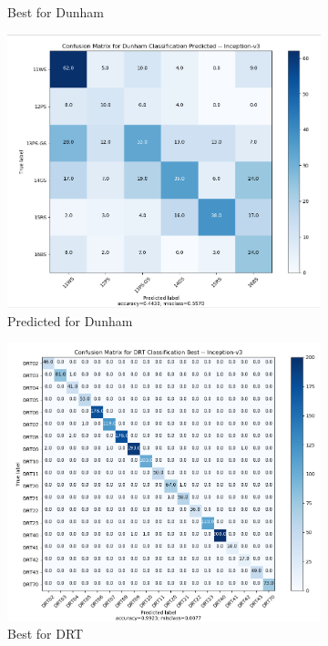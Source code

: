 \begin{figure}
\begin{subfigure}{.5\textwidth}
  \caption{Best for Dunham}
  \label{fig:googcm_dunham}
\end{subfigure}%
\begin{subfigure}{.5\textwidth}
  \centering
  \includegraphics[width=.8\linewidth]{figures/04-go_dunham_pred.PNG}
  \caption{Predicted for Dunham}
  \label{fig:googcmpred_dunham}
\end{subfigure}
\begin{subfigure}{.5\textwidth}
  \centering
  \includegraphics[width=.8\linewidth]{figures/04-go_drt_best.PNG}
  \caption{Best for DRT}
  \label{fig:googcm_drt}
\end{subfigure}%
\begin{subfigure}{.5\textwidth}
  \centering

\end{subfigure}
\end{figure}
